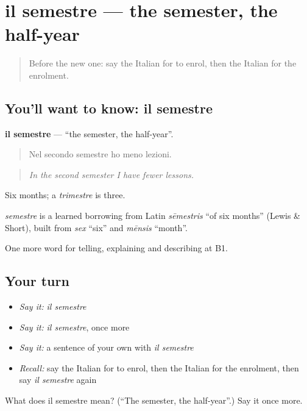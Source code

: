 \section[il semestre]{il semestre — the semester, the half-year}

\label{lesson:IT-C380-semestre}



\begin{quote}
Before the new one: say the Italian for to enrol, then the Italian for the enrolment.
\end{quote}

\subsection*{You'll want to know: il semestre}
\textbf{il semestre} — \textquotedblleft{}the semester, the half-year\textquotedblright{}.

\begin{quote}
Nel secondo semestre ho meno lezioni.
\end{quote}

\begin{quote}
\emph{In the second semester I have fewer lessons.}
\end{quote}

Six months; a \emph{trimestre} is three.

\begin{cousinweb}
\emph{semestre} is a learned borrowing from Latin \emph{sēmestris} \textquotedblleft{}of six months\textquotedblright{} (Lewis \& Short), built from \emph{sex} \textquotedblleft{}six\textquotedblright{} and \emph{mēnsis} \textquotedblleft{}month\textquotedblright{}.
\end{cousinweb}

\begin{grammarlens}[title={What you've built}]
One more word for telling, explaining and describing at B1.
\end{grammarlens}

\subsection*{Your turn}
\begin{itemize}
\raggedright
  \item \emph{Say it:} \emph{il semestre}
  \item \emph{Say it:} \emph{il semestre}, once more
  \item \emph{Say it:} a sentence of your own with \emph{il semestre}
  \item \emph{Recall:} say the Italian for to enrol, then the Italian for the enrolment, then say \emph{il semestre} again
\end{itemize}

\begin{tcolorbox}[breakable,colback=teal!4,colframe=teal!35!black,title={Before you move on}]
What does il semestre mean? (\textquotedblleft{}The semester, the half-year\textquotedblright{}.) Say it once more.
\end{tcolorbox}
